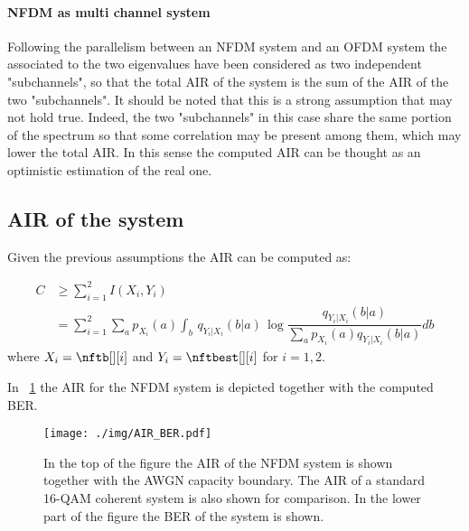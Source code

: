 \paragraph{NFDM as multi channel system}
Following the parallelism between an \ac{NFDM} system and an \ac{OFDM} system the \scatcoef{} associated to the two eigenvalues have been considered as two independent "subchannels", so that the total \ac{AIR} of the system is the sum of the \ac{AIR} of the two "subchannels". It should be noted that this is a strong assumption that may not hold true. Indeed, the two "subchannels" in this case share the same portion of the spectrum so that some correlation may be present among them, which may lower the total \ac{AIR}. In this sense the computed \ac{AIR} can be thought as an optimistic estimation of the real one.

\subsection{\ac{AIR} of the system}
Given the previous assumptions the \ac{AIR} can be computed as:

\begin{equation}
\label{eq:nft_capacity}
\begin{split}
    C& \ge  \sum_{i=1}^{2} I(X_i,Y_i)\\
	&= \sum_{i=1}^{2} \sum_{a} p_{X_i}(a)\int_{b}\,q_{Y_i|X_i}(b|a)\,\log \dfrac{q_{Y_i|X_i}(b|a)}{\sum_{a} p_{X_i}(a)q_{Y_i|X_i}(b|a)} db
\end{split}
\end{equation}
where $X_i = \nftb[][i]$ and $Y_i = \nftbest[][i]$ for $i=1,2$.

In \figurename~\ref{fig:air_nft} the \ac{AIR} for the \ac{NFDM} system is depicted together with the computed \ac{BER}.
\begin{figure}[!htb]
  \centering
  \texttt{[image: ./img/AIR\_BER.pdf]}
  \caption{In the top of the figure the \ac{AIR} of the \ac{NFDM} system is shown together with the \ac{AWGN} capacity boundary. The \ac{AIR} of a standard 16-\ac{QAM} coherent system is also shown for comparison.
  In the lower part of the figure the \ac{BER} of the system is shown.}
  \label{fig:air_nft}
\end{figure}
